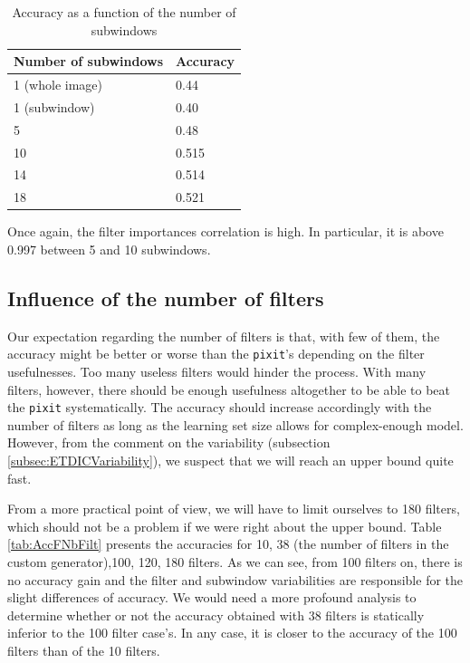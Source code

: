 \documentclass[a4paper]{report}
\begin{document}
		\begin{table}
			\centering
				\begin{tabular}{l|l}
				\hline
				Number of subwindows & Accuracy \\
				\hline \hline
				1 (whole image) & 0.44\\
				1 (subwindow) & 0.40 \\
				5 & 0.48 \\
				10 & 0.515 \\
				14 &  0.514\\
				18 &  0.521 \\
				\hline
				
				\end{tabular}
			\caption{\label{tab:AccFNbSW}Accuracy as a function of the number of subwindows}
		\end{table}
		
		
	\par
	Once again, the filter importances correlation is high. In particular, it is above 0.997 between 5 and 10 subwindows.
	
		
		
	\subsection{Influence of the number of filters}
	Our expectation regarding the number of filters is that, with few of them, the accuracy might be better or worse than the \texttt{pixit}'s depending on the filter usefulnesses. Too many useless filters would hinder the process. With many filters, however, there should be enough usefulness altogether to be able to beat the \texttt{pixit} systematically. The accuracy should increase accordingly with the number of filters as long as the learning set size allows for complex-enough model. However, from the comment on the variability (subsection \ref{subsec:ETDICVariability}), we suspect that we will reach an upper bound quite fast. 
	\par
	From a more practical point of view, we will have to limit ourselves to 180 filters, which should not be a problem if we were right about the upper bound. Table \ref{tab:AccFNbFilt} presents the accuracies for 10, 38 (the number of filters in the custom generator),100, 120, 180 filters. As we can see, from 100 filters on, there is no accuracy gain and the filter and subwindow variabilities are responsible for the slight differences of accuracy. We would need a more profound analysis to determine whether or not the accuracy obtained with 38 filters is statically inferior to the 100 filter case's. In any case, it is closer to the accuracy of the 100 filters than of the 10 filters.
	
\end{document}
